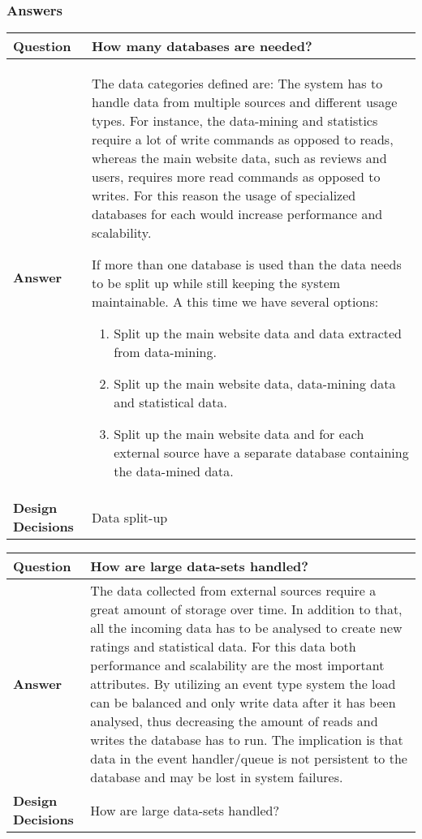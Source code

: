 \subsubsection{Answers}
\begin{longtable}{| l |  p{12cm} |}
\hline
\textbf{Question} & \textbf{ How many databases are needed?} \\ \hline
\textbf{Answer} &
The data categories defined are:
The system has to handle data from multiple sources and different usage types. For instance, the data-mining and statistics require a lot of write commands as opposed to reads, whereas the main website data, such as reviews and users, requires more read commands as opposed to writes. For this reason the usage of specialized databases for each would increase performance and scalability.

If more than one database is used than the data needs to be split up while still keeping the system maintainable. 
A this time we have several options:
\begin{enumerate}
\item Split up the main website data and data extracted from data-mining.
\item Split up the main website data, data-mining data and statistical data.
\item Split up the main website data and for each external source have a separate database containing the data-mined data.
\end{enumerate}
 \\ \hline
\textbf{Design Decisions} & Data split-up \\ \hline
\end{longtable}

\begin{longtable}{| l |  p{12cm} |}
\hline
\textbf{Question} & \textbf{How are large data-sets handled?} \\ \hline
\textbf{Answer} &
The data collected from external sources require a great amount of storage over time. In addition to that, all the incoming data has to be analysed to create new ratings and statistical data. For this data both performance and scalability are the most important attributes.
By utilizing an event type system the load can be balanced and only write data after it has been analysed, thus decreasing the amount of reads and writes the database has to run. The implication is that data in the event handler/queue is not persistent to the database and may be lost in system failures.
 \\ \hline
\textbf{Design Decisions} & How are large data-sets handled? \\ \hline
\end{longtable}


